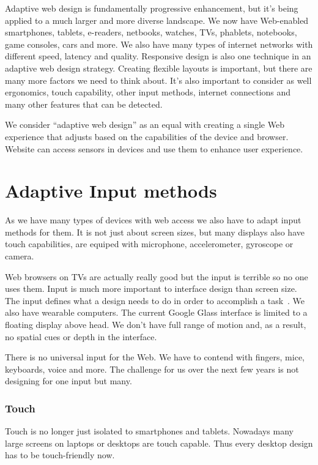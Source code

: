 \documentclass{iitsrc}
\begin{document}
Adaptive web design is fundamentally progressive enhancement, but it's being applied to a much larger and more diverse landscape. We now have Web-enabled smartphones, tablets, e-readers, netbooks, watches, TVs, phablets, notebooks, game consoles, cars and more. We also have many types of internet networks with different speed, latency and quality. Responsive design is also one technique in an adaptive web design strategy. Creating flexible layouts is important, but there are many more factors we need to think about. It's also important to consider as well ergonomics, touch capability, other input methods, internet connections and many other features that can be detected.

We consider ``adaptive web design'' as an equal with creating a single Web experience that adjusts based on the capabilities of the device and browser. Website can access sensors in devices and use them to enhance user experience.


\section{Adaptive Input methods}

As we have many types of devices with web access we also have to adapt input methods for them. It is not just about screen sizes, but many displays also have touch capabilities, are equiped with microphone, accelerometer, gyroscope or camera.

Web browsers on TVs are actually really good but the input is terrible so no one uses them. Input is much more important to interface design than screen size. The input defines what a design needs to do in order to accomplish a task~\cite{adaptiveinput}. We also have wearable computers. The current Google Glass interface is limited to a floating display above head. We don't have full range of motion and, as a result, no spatial cues or depth in the interface.

There is no universal input for the Web. We have to contend with fingers, mice, keyboards, voice and more. The challenge for us over the next few years is not designing for one input but many.

\subsubsection*{Touch} %
\label{sub:touch}

Touch is no longer just isolated to smartphones and tablets. Nowadays many large screens on laptops or desktops are touch capable. Thus every desktop design has to be touch-friendly now.
\end{document}

